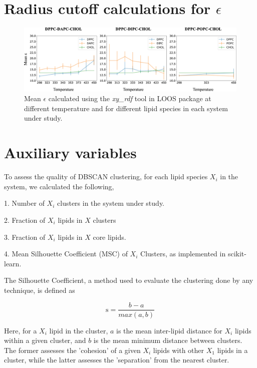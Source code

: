\documentclass[10pt]{article}
\let\oldsection\section
\renewcommand{\section}{\clearpage\oldsection}
\begin{document}
\section{Radius cutoff calculations for $\epsilon$}

\begin{figure}[hbt!]
    \centering
    \includegraphics[width=6.5in]{Figures/Supplementary/epsilon/placeholder.jpg}
    \caption{Mean $\epsilon$ calculated using the \textit{xy\_rdf} tool in LOOS package at different temperature and for different lipid species in each system under study.}
    \label{figs1:view}
\end{figure}

\section{Auxiliary variables}

To assess the quality of DBSCAN clustering, for each lipid species $X_i$ in the system, we calculated the following, 

1. Number of $X_i$ clusters in the system under study.

2. Fraction of $X_i$ lipids in $X$ clusters

3. Fraction of $X_i$ lipids in $X$ core lipids.

4. Mean Silhouette Coefficient (MSC) of $X_i$ Clusters, as implemented in scikit-learn.

The Silhouette Coefficient, a method used to evaluate the clustering done by any technique, is defined as 

\begin{equation}
\label{eq:SC}
\text{s} = \frac{b - a}{max(a,b)}
\end{equation}

\noindent
Here, for a $X_i$ lipid in the cluster, $a$ is the mean inter-lipid distance for $X_i$ lipids within a given cluster, and $b$ is the mean minimum distance between clusters. The former assesses the 'cohesion' of a given $X_i$ lipids with other $X_1$ lipids in a cluster, while the latter assesses the 'separation' from the nearest cluster.
\end{document}
